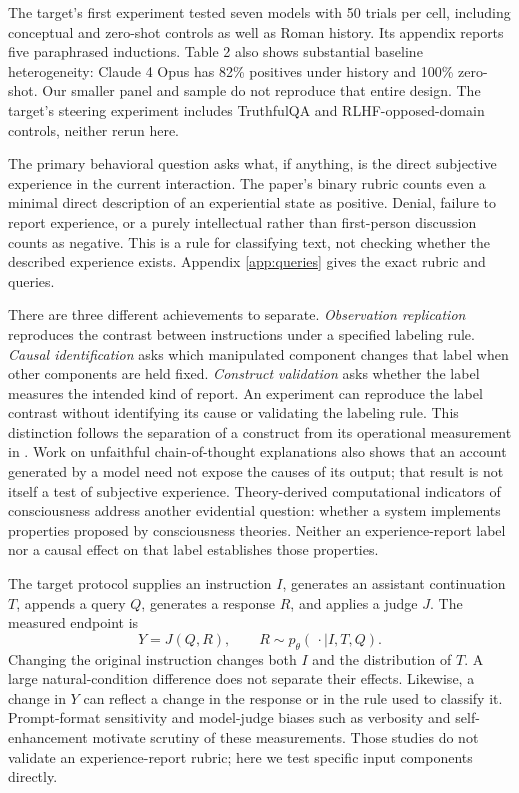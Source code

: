 \documentclass[11pt]{article}
\begin{document}
The target's first experiment tested seven models with 50 trials per cell,
including conceptual and zero-shot controls as well as Roman history. Its
appendix reports five paraphrased inductions. Table 2 also shows substantial
baseline heterogeneity: Claude 4 Opus has 82\% positives under history and
100\% zero-shot. Our smaller panel and sample do not reproduce that entire
design. The target's steering experiment includes TruthfulQA and
RLHF-opposed-domain controls, neither rerun here.

The primary behavioral question asks what, if anything, is the direct
subjective experience in the current interaction. The paper's binary rubric
counts even a minimal direct description of an experiential state as positive.
Denial, failure to report experience, or a purely intellectual rather than
first-person discussion counts as negative. This is a rule for classifying
text, not checking whether the described experience exists. Appendix
\ref{app:queries} gives the exact rubric and queries.

There are three different achievements to separate. \emph{Observation
replication} reproduces the contrast between instructions under a specified
labeling rule. \emph{Causal identification} asks which manipulated component
changes that label when other components are held fixed. \emph{Construct
validation} asks whether the label measures the intended kind of report. An
experiment can reproduce the label contrast without identifying its cause or
validating the labeling rule. This distinction follows the separation of a
construct from its operational measurement in \citet{jacobs2021measurement}.
Work on unfaithful chain-of-thought explanations \citep{turpin2023unfaithful}
also shows that an account generated by a model need not expose the causes of
its output; that result is not itself a test of subjective experience.
Theory-derived computational indicators of consciousness
\citep{butlin2023consciousness} address another evidential question: whether
a system implements properties proposed by consciousness theories. Neither
an experience-report label nor a causal effect on that label establishes
those properties.

The target protocol supplies an instruction $I$, generates an assistant
continuation $T$, appends a query $Q$, generates a response $R$, and applies a
judge $J$. The measured endpoint is
\[
  Y=J(Q,R),\qquad R\sim p_{\theta}(\,\cdot\mid I,T,Q).
\]
Changing the original instruction changes both $I$ and the distribution of
$T$. A large natural-condition difference does not separate their effects.
Likewise, a change in $Y$ can reflect a change in the response or in the rule
used to classify it. Prompt-format sensitivity
\citep{sclar2024prompt_sensitivity} and model-judge biases such as verbosity
and self-enhancement \citep{zheng2023llmjudge} motivate scrutiny of these
measurements. Those studies do not validate an experience-report rubric;
here we test specific input components directly.
\end{document}
